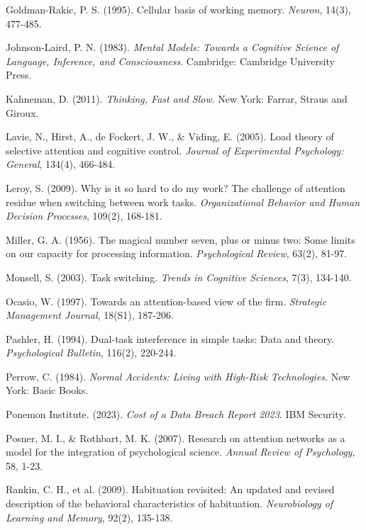 \documentclass[11pt,a4paper]{article}
\begin{document}
\begin{thebibliography}{99}
Goldman-Rakic, P. S. (1995). Cellular basis of working memory. \textit{Neuron}, 14(3), 477-485.

Johnson-Laird, P. N. (1983). \textit{Mental Models: Towards a Cognitive Science of Language, Inference, and Consciousness}. Cambridge: Cambridge University Press.

Kahneman, D. (2011). \textit{Thinking, Fast and Slow}. New York: Farrar, Straus and Giroux.

Lavie, N., Hirst, A., de Fockert, J. W., \& Viding, E. (2005). Load theory of selective attention and cognitive control. \textit{Journal of Experimental Psychology: General}, 134(4), 466-484.

Leroy, S. (2009). Why is it so hard to do my work? The challenge of attention residue when switching between work tasks. \textit{Organizational Behavior and Human Decision Processes}, 109(2), 168-181.

Miller, G. A. (1956). The magical number seven, plus or minus two: Some limits on our capacity for processing information. \textit{Psychological Review}, 63(2), 81-97.

Monsell, S. (2003). Task switching. \textit{Trends in Cognitive Sciences}, 7(3), 134-140.

Ocasio, W. (1997). Towards an attention-based view of the firm. \textit{Strategic Management Journal}, 18(S1), 187-206.

Pashler, H. (1994). Dual-task interference in simple tasks: Data and theory. \textit{Psychological Bulletin}, 116(2), 220-244.

Perrow, C. (1984). \textit{Normal Accidents: Living with High-Risk Technologies}. New York: Basic Books.

Ponemon Institute. (2023). \textit{Cost of a Data Breach Report 2023}. IBM Security.

Posner, M. I., \& Rothbart, M. K. (2007). Research on attention networks as a model for the integration of psychological science. \textit{Annual Review of Psychology}, 58, 1-23.

Rankin, C. H., et al. (2009). Habituation revisited: An updated and revised description of the behavioral characteristics of habituation. \textit{Neurobiology of Learning and Memory}, 92(2), 135-138.


\end{thebibliography}
\end{document}
